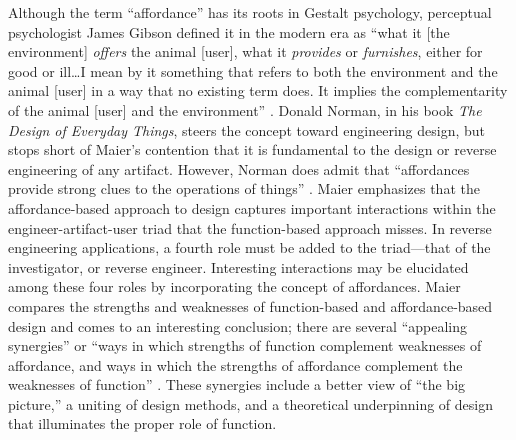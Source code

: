 Although the term “affordance” has its roots in Gestalt
psychology\citep{koffka1935}, perceptual psychologist James Gibson
defined it in the modern era as “what it [the environment]
\textit{offers} the animal [user], what it \textit{provides} or
\textit{furnishes}, either for good or ill{\ldots}I mean by it something that
refers to both the environment and the animal [user] in a way that no
existing term does. It implies the complementarity of the animal [user]
and the environment” \citep[][p.~127]{gibson1979}. Donald Norman, in his book
\textit{The Design of Everyday Things}\citep{norman1988}, steers the
concept toward engineering design, but stops short of Maier’s
contention that it is fundamental to the design or reverse engineering
of any artifact. However, Norman does admit that ``affordances provide
strong clues to the operations of things'' \citep[][p.~9]{norman1988}. Maier emphasizes that the
affordance-based approach to design captures important interactions
within the engineer-artifact-user triad that the function-based
approach misses. In reverse engineering applications, a fourth role
must be added to the triad---that of the investigator, or reverse
engineer. Interesting interactions may be elucidated among these four
roles by incorporating the concept of affordances. Maier compares the
strengths and weaknesses of function-based and affordance-based design
and comes to an interesting conclusion; there are several “appealing
synergies” or ``ways in which strengths of function complement
weaknesses of affordance, and ways in which the strengths of affordance
complement the weaknesses of function'' \citep{maierfadel2002}. These %
synergies include a better view of “the big picture,” a uniting of
design methods, and a theoretical underpinning of design that
illuminates the proper role of function.


